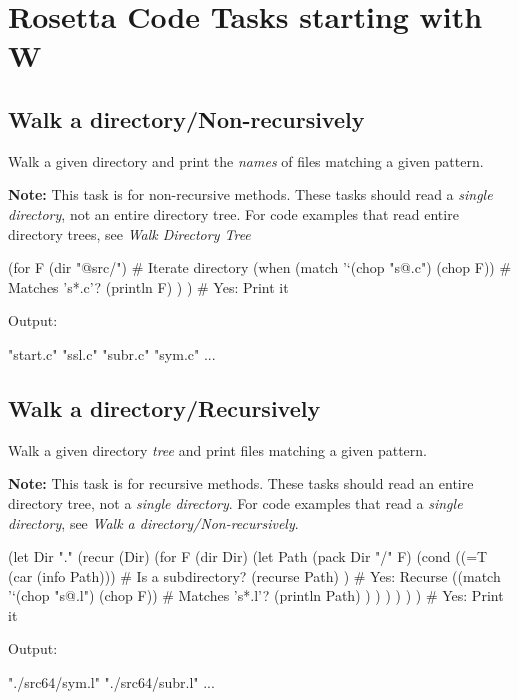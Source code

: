 %
%
%

\chapter{Rosetta Code Tasks starting with W}

\section*{Walk a directory/Non-recursively}

Walk a given directory and print the \emph{names} of files matching a
given pattern.

\textbf{Note:} This task is for non-recursive methods. These tasks
should read a \emph{single directory}, not an entire directory tree. For
code examples that read entire directory trees, see
\emph{Walk Directory Tree}


\begin{wideverbatim}

(for F (dir "@src/")                         # Iterate directory
   (when (match '`(chop "s@.c") (chop F))    # Matches 's*.c'?
      (println F) ) )                        # Yes: Print it

Output:

"start.c"
"ssl.c"
"subr.c"
"sym.c"
...

\end{wideverbatim}

\pagebreak{}
\section*{Walk a directory/Recursively}

Walk a given directory \emph{tree} and print files matching a given
pattern.

\textbf{Note:} This task is for recursive methods. These tasks should
read an entire directory tree, not a \emph{single directory}. For code
examples that read a \emph{single directory}, see \emph{Walk a
  directory/Non-recursively}.


\begin{wideverbatim}

(let Dir "."
   (recur (Dir)
      (for F (dir Dir)
         (let Path (pack Dir "/" F)
            (cond
               ((=T (car (info Path)))             # Is a subdirectory?
                  (recurse Path) )                 # Yes: Recurse
               ((match '`(chop "s@.l") (chop F))   # Matches 's*.l'?
                  (println Path) ) ) ) ) ) )       # Yes: Print it

Output:

"./src64/sym.l"
"./src64/subr.l"
...

\end{wideverbatim}

